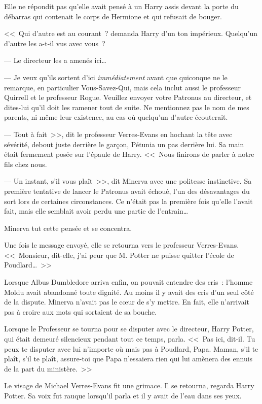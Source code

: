 Elle ne répondit pas qu'elle avait pensé à un Harry assis devant la porte du débarras qui contenait le corps de Hermione et qui refusait de bouger.

<<~Qui d'autre est au courant~? demanda Harry d'un ton impérieux. Quelqu'un d'autre les a-t-il vus avec vous~?

--- Le directeur les a amenés ici…

--- Je veux qu'ils sortent d'ici \emph{immédiatement} avant que quiconque ne le remarque, en particulier Vous-Savez-Qui, mais cela inclut aussi le professeur Quirrell et le professeur Rogue. Veuillez envoyer votre Patronus au directeur, et dites-lui qu'il doit les ramener tout de suite. Ne mentionnez pas le nom de mes parents, ni même leur existence, au cas où quelqu'un d'autre écouterait.

--- Tout à fait~>>, dit le professeur Verres-Evans en hochant la tête avec sévérité, debout juste derrière le garçon, Pétunia un pas derrière lui. Sa main était fermement posée sur l'épaule de Harry. <<~Nous finirons de parler à notre fils chez nous.

--- Un instant, s'il vous plaît~>>, dit Minerva avec une politesse instinctive. Sa première tentative de lancer le Patronus avait échoué, l'un des désavantages du sort lors de certaines circonstances. Ce n'était pas la première fois qu'elle l'avait fait, mais elle semblait avoir perdu une partie de l'entrain…

Minerva tut cette pensée et se concentra.

Une fois le message envoyé, elle se retourna vers le professeur Verres-Evans. <<~Monsieur, dit-elle, j'ai peur que M. Potter ne puisse quitter l'école de Poudlard…~>>

Lorsque Albus Dumbledore arriva enfin, on pouvait entendre des cris~: l'homme Moldu avait abandonné toute dignité. Au moins il y avait des cris d'un seul côté de la dispute. Minerva n'avait pas le cœur de s'y mettre. En fait, elle n'arrivait pas à croire aux mots qui sortaient de sa bouche.

Lorsque le Professeur se tourna pour se disputer avec le directeur, Harry Potter, qui était demeuré silencieux pendant tout ce temps, parla. <<~Pas ici, dit-il. Tu peux te disputer avec lui n'importe où mais pas à Poudlard, Papa. Maman, s'il te plaît, s'il te plaît, assure-toi que Papa n'essaiera rien qui lui amènera des ennuis de la part du ministère.~>>

Le visage de Michael Verres-Evans fit une grimace. Il se retourna, regarda Harry Potter. Sa voix fut rauque lorsqu'il parla et il y avait de l'eau dans ses yeux.

